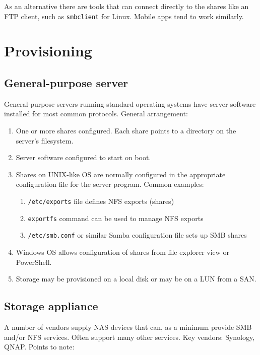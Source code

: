 \documentclass[slides]{pgnotes}
\begin{document}
As an alternative there are tools that can connect directly to the
shares like an FTP client, such as \texttt{smbclient} for Linux. Mobile
apps tend to work similarly.

\section{Provisioning}
\label{sec:provisioning}

\subsection{General-purpose server}
\label{sec:general-purpose-server}

General-purpose servers running standard operating systems have server
software installed for most common protocols. General arrangement:

\begin{enumerate}
\item
  One or more shares configured. Each share points to a directory on the
  server's filesystem.
\item
  Server software configured to start on boot.
\item
  Shares on UNIX-like OS are normally configured in the appropriate
  configuration file for the server program. Common examples:

  \begin{enumerate}
  \item
    \texttt{/etc/exports} file defines NFS exports (shares)
  \item
    \texttt{exportfs} command can be used to manage NFS exports
  \item
    \texttt{/etc/smb.conf} or similar Samba configuration file sets up
    SMB shares
  \end{enumerate}
\item
  Windows OS allows configuration of shares from file explorer view or
  PowerShell.
\item
  Storage may be provisioned on a local disk or may be on a LUN from a
  SAN.
\end{enumerate}

\subsection{Storage appliance}
\label{sec:storage-appliance}

A number of vendors supply NAS devices that can, as a minimum provide
SMB and/or NFS services. Often support many other services. Key vendors:
Synology, QNAP. Points to note:
\end{document}
